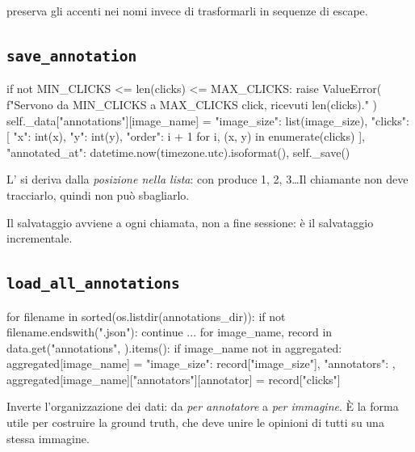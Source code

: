  preserva gli accenti nei nomi invece di trasformarli in sequenze di
escape.

\subsection{\texttt{save\_annotation}}

\begin{idebox}
\begin{pycode}
if not MIN_CLICKS <= len(clicks) <= MAX_CLICKS:
    raise ValueError(
        f"Servono da {MIN_CLICKS} a {MAX_CLICKS} click, ricevuti {len(clicks)}."
    )
self._data["annotations"][image_name] = {
    "image_size": list(image_size),
    "clicks": [
        {"x": int(x), "y": int(y), "order": i + 1}
        for i, (x, y) in enumerate(clicks)
    ],
    "annotated_at": datetime.now(timezone.utc).isoformat(),
}
self._save()
\end{pycode}
\end{idebox}

L' si deriva dalla \emph{posizione nella lista}:  con
 produce 1, 2, 3\ldots Il chiamante non deve tracciarlo, quindi non può sbagliarlo.

Il salvataggio avviene a ogni chiamata, non a fine sessione: è il salvataggio incrementale.

\subsection{\texttt{load\_all\_annotations}}

\begin{idebox}
\begin{pycode}
for filename in sorted(os.listdir(annotations_dir)):
    if not filename.endswith(".json"):
        continue
    ...
    for image_name, record in data.get("annotations", {}).items():
        if image_name not in aggregated:
            aggregated[image_name] = {
                "image_size": record["image_size"],
                "annotators": {},
            }
        aggregated[image_name]["annotators"][annotator] = record["clicks"]
\end{pycode}
\end{idebox}

Inverte l'organizzazione dei dati: da \emph{per annotatore} a \emph{per immagine}. È la forma
utile per costruire la ground truth, che deve unire le opinioni di tutti su una stessa immagine.

